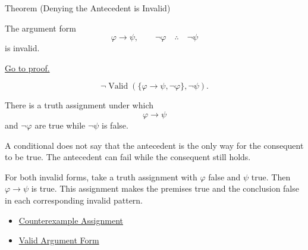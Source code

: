 \begin{theorembox}{Theorem (Denying the Antecedent is Invalid)}
\begin{theorem}
\label{thm:denying-antecedent-invalid-propositional-logic}
The argument form
\[
\varphi\to\psi,\qquad \neg\varphi \quad\therefore\quad \neg\psi
\]
is invalid.

\noindent\hyperref[prf:denying-antecedent-invalid-propositional-logic]{Go to proof.}
\end{theorem}
\end{theorembox}

\begin{remark*}
\[
\neg\operatorname{Valid}(\{\varphi\to\psi,\neg\varphi\},\neg\psi).
\]
\end{remark*}

\begin{remark*}
There is a truth assignment under which \[
  \varphi\to\psi
\] and \(\neg\varphi\)
are true while \(\neg\psi\) is false.
\end{remark*}

\begin{remark*}[Interpretation]
A conditional does not say that the antecedent is the only way for the consequent
to be true. The antecedent can fail while the consequent still holds.
\end{remark*}

\begin{remark*}[Exposition]
For both invalid forms, take a truth assignment with \(\varphi\) false and
\(\psi\) true. Then \(\varphi\to\psi\) is true. This assignment makes the
premises true and the conclusion false in each corresponding invalid pattern.
\end{remark*}

\begin{dependencies}
\begin{itemize}
  \item \hyperref[def:counterexample-assignment-propositional-logic]{Counterexample Assignment}
  \item \hyperref[def:valid-argument-form-propositional-logic]{Valid Argument Form}
\end{itemize}
\end{dependencies}
